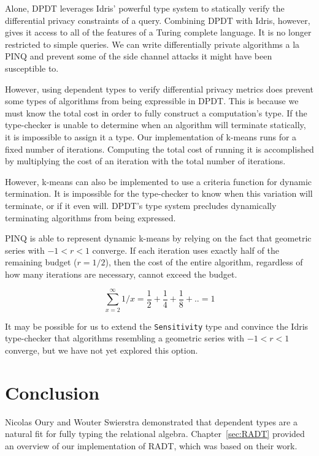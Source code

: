\documentclass[12pt]{report}
\begin{document}
Alone, DPDT leverages Idris' powerful type system to statically verify the differential privacy constraints of a query.
Combining DPDT with Idris, however, gives it access to all of the features of a Turing complete language.
It is no longer restricted to simple queries.
We can write differentially private algorithms a la PINQ and prevent some of the side channel attacks it might have been susceptible to.

However, using dependent types to verify differential privacy metrics does prevent some types of algorithms from being expressible in DPDT.
This is because we must know the total cost in order to fully construct a computation's type.
If the type-checker is unable to determine when an algorithm will terminate statically, it is impossible to assign it a type.
Our implementation of k-means runs for a fixed number of iterations.
Computing the total cost of running it is accomplished by multiplying the cost of an iteration with the total number of iterations.

However, k-means can also be implemented to use a criteria function for dynamic termination.
It is impossible for the type-checker to know when this variation will terminate, or if it even will.
DPDT's type system precludes dynamically terminating algorithms from being expressed.

PINQ is able to represent dynamic k-means by relying on the fact that geometric series with $-1 < r < 1$ converge.
If each iteration uses exactly half of the remaining budget ($r=1/2$), then the cost of the entire algorithm, regardless of how many iterations are necessary, cannot exceed the budget.

$$\sum_{x=2}^{\infty} 1/x = \frac{1}{2} + \frac{1}{4} + \frac{1}{8} + .. = 1$$

It may be possible for us to extend the \texttt{Sensitivity} type and convince the Idris type-checker that algorithms resembling a geometric series with $-1 < r < 1$ converge, but we have not yet explored this option.

\chapter{Conclusion}\label{sec:conclusion}

Nicolas Oury and Wouter Swierstra demonstrated that dependent types are a natural fit for fully typing the relational algebra\cite{OurySwierstra08PowerOfPi}.
Chapter~\ref{sec:RADT} provided an overview of our implementation of RADT, which was based on their work.
\end{document}
